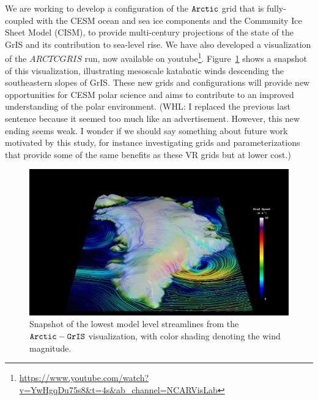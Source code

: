 \documentclass[draft]{agujournal2019}
\begin{document}
We are  working to develop a configuration of the $\tt Arctic$ grid that is fully-coupled with the CESM ocean and sea ice components and the Community Ice Sheet Model (CISM), to provide multi-century projections of the state of the GrIS and its contribution to sea-level rise.
We have also developed a visualization of the $ARCTCGRIS$ run, now available on youtube\footnote{\url{https://www.youtube.com/watch?v=YwHgqDu75s8&t=4s&ab_channel=NCARVisLab}}.
Figure~\ref{fig:viz} shows a snapshot of this visualization, illustrating mesoscale katabatic winds descending the southeastern slopes of GrIS.
These new grids and configurations will provide new opportunities for CESM polar science and aims to contribute to an improved understanding of the polar environment.
{\color{blue} (WHL: I replaced the previous last sentence because it seemed too much like an advertisement.  However, this new ending seems weak.  I wonder if we should say something about future work motivated by this study, for instance investigating grids and parameterizations that provide some of the same benefits as these VR grids but at lower cost.)}

\begin{figure}[t]
\begin{center}
         \includegraphics[width=130mm]{figs/Vis1472.jpg}
\end{center}
\caption{Snapshot of the lowest model level streamlines from the $\tt Arctic-GrIS$ visualization, with color shading denoting the wind magnitude.}
\label{fig:viz}
\end{figure}
\end{document}
